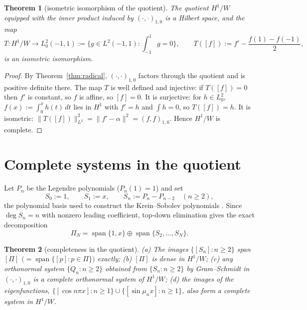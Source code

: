 ﻿\documentclass[11pt]{article}
\newtheorem{theorem}{Theorem}[section]
\begin{document}
\begin{theorem}[isometric isomorphism of the quotient]\label{thm:quotient}
	The quotient $H^1/W$ equipped with the inner product induced by
	$(\cdot,\cdot)_{1,0}$ is a Hilbert space, and the map
	\begin{equation*}
		T\colon H^1/W\to L^2_0(-1,1):=\{g\in L^2(-1,1): \int_{-1}^1 g=0\},
		\qquad
		T([f]):=f'-\frac{f(1)-f(-1)}2,
	\end{equation*}
	is an isometric isomorphism.
\end{theorem}

\begin{proof}
	By Theorem~\ref{thm:radical}, $(\cdot,\cdot)_{1,0}$ factors through the
	quotient and is positive definite there.  The map $T$ is well defined and
	injective: if $T([f])=0$ then $f'$ is constant, so $f$ is affine, so
	$[f]=0$.  It is surjective: for $h\in L^2_0$, $f(x):=\int_0^x h(t)\,dt$
	lies in $H^1$ with $f'=h$ and $\int h=0$, so $T([f])=h$.  It is
	isometric:
	$\|T([f])\|_{L^2}^2=\|f'-\alpha\|^2=(f,f)_{1,0}$.  Hence $H^1/W$ is
	complete.
\end{proof}

\section{Complete systems in the quotient}

Let $P_n$ be the Legendre polynomials ($P_n(1)=1$) and set
\begin{equation*}
	S_0:=1,\qquad S_1:=x,\qquad S_n:=P_n-P_{n-2}\quad(n\ge 2),
\end{equation*}
the polynomial basis used to construct the Krein--Sobolev polynomials
\cite[eq.~(15)]{axioms}.  Since $\deg S_n=n$ with nonzero leading
coefficient, top-down elimination gives the exact decomposition
\begin{equation*}
	\Pi_N=\operatorname{span}\{1,x\}\oplus
	\operatorname{span}\{S_2,\ldots,S_N\}.
\end{equation*}

\begin{theorem}[completeness in the quotient]\label{thm:complete}
	(a) The images $\{[S_n]: n\ge 2\}$ span $[\Pi]$
	$\bigl(=\operatorname{span}\{[p]:p\in\Pi\}\bigr)$ exactly;
	(b) $[\Pi]$ is dense in $H^1/W$;
	(c) any orthonormal system $\{Q_n:n\ge 2\}$ obtained from
	$\{S_n:n\ge 2\}$ by Gram--Schmidt in $(\cdot,\cdot)_{1,0}$ is a complete
	orthonormal system of $H^1/W$;
	(d) the images of the eigenfunctions,
	$\{[\cos n\pi x]:n\ge 1\}\cup\{[\sin\mu_n x]:n\ge 1\}$, also form a
	complete system in $H^1/W$.
\end{theorem}
\end{document}
